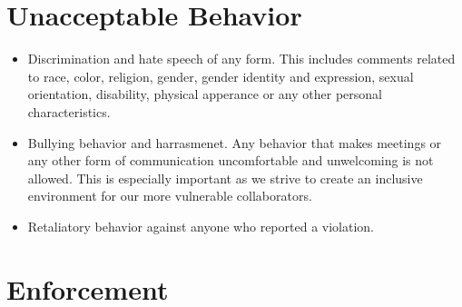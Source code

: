 \documentclass[10pt]{article}
\begin{document}
\section{Unacceptable Behavior}
  \begin{itemize}
    \item Discrimination and hate speech of any form. This includes comments
      related to race, color, religion, gender, gender identity and expression, 
      sexual orientation, disability, physical apperance or any other personal 
      characteristics. 
    \item Bullying behavior and harrasmenet. Any behavior that makes meetings 
      or any other form of communication uncomfortable and unwelcoming is not
      allowed.  This is especially important as we strive to create an 
      inclusive environment for our more vulnerable collaborators. 
    \item Retaliatory behavior against anyone who reported a violation. 
  \end{itemize}

\section{Enforcement}
\end{document}
